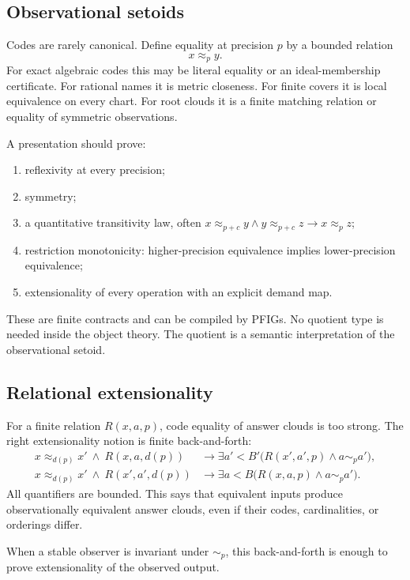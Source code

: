 \subsection{Observational setoids}

Codes are rarely canonical.  Define equality at precision \(p\) by a bounded relation
\[
 x\approx_p y.
\]
For exact algebraic codes this may be literal equality or an ideal-membership certificate.  For rational names it is metric closeness.  For finite covers it is local equivalence on every chart.  For root clouds it is a finite matching relation or equality of symmetric observations.

A presentation should prove:

\begin{enumerate}
\item reflexivity at every precision;
\item symmetry;
\item a quantitative transitivity law, often
\(x\approx_{p+c}y\wedge y\approx_{p+c}z\to x\approx_p z\);
\item restriction monotonicity: higher-precision equivalence implies lower-precision equivalence;
\item extensionality of every operation with an explicit demand map.
\end{enumerate}

These are finite contracts and can be compiled by PFIGs.  No quotient type is needed inside the object theory.  The quotient is a semantic interpretation of the observational setoid.

\subsection{Relational extensionality}

For a finite relation \(R(x,a,p)\), code equality of answer clouds is too strong.  The right extensionality notion is finite back-and-forth:
\begin{align*}
 x\approx_{d(p)}x'\ \wedge\ R(x,a,d(p))
 &\to \exists a'<B'\bigl(R(x',a',p)\wedge a\sim_p a'\bigr),\\
 x\approx_{d(p)}x'\ \wedge\ R(x',a',d(p))
 &\to \exists a<B\bigl(R(x,a,p)\wedge a\sim_p a'\bigr).
\end{align*}
All quantifiers are bounded.  This says that equivalent inputs produce observationally equivalent answer clouds, even if their codes, cardinalities, or orderings differ.

When a stable observer is invariant under \(\sim_p\), this back-and-forth is enough to prove extensionality of the observed output.

